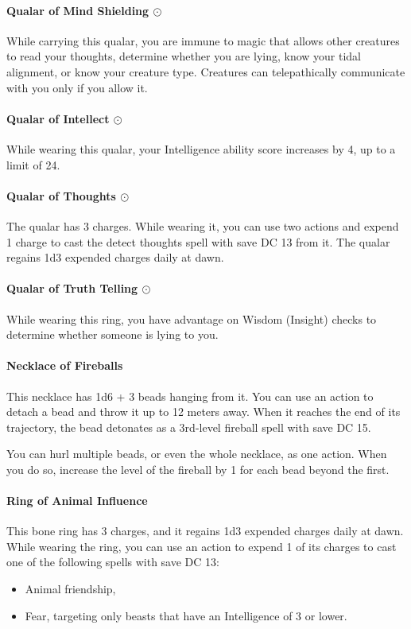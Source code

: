     \paragraph{Qualar of Mind Shielding $\odot$}
        While carrying this qualar, you are immune to magic that allows other creatures to read your thoughts, determine whether you are lying, know your tidal alignment, or know your creature type.
        Creatures can telepathically communicate with you only if you allow it.
    \paragraph{Qualar of Intellect $\odot$}
        While wearing this qualar, your Intelligence ability score increases by 4, up to a limit of 24.
    \paragraph{Qualar of Thoughts $\odot$}
        The qualar has 3 charges.
        While wearing it, you can use two actions and expend 1 charge to cast the detect thoughts spell with save DC 13 from it.
        The qualar regains 1d3 expended charges daily at dawn.
    \paragraph{Qualar of Truth Telling $\odot$}
        While wearing this ring, you have advantage on Wisdom (Insight) checks to determine whether someone is lying to you.
    \paragraph{Necklace of Fireballs}
        This necklace has 1d6 + 3 beads hanging from it. You can use an action to detach a bead and throw it up to 12 meters away.
        When it reaches the end of its trajectory, the bead detonates as a 3rd-level fireball spell with save DC 15.

        You can hurl multiple beads, or even the whole necklace, as one action.
        When you do so, increase the level of the fireball by 1 for each bead beyond the first.
    \paragraph{Ring of Animal Influence}
        This bone ring has 3 charges, and it regains 1d3 expended charges daily at dawn.
        While wearing the ring, you can use an action to expend 1 of its charges to cast one of the following spells with save DC 13:
        \begin{itemize}
            \item Animal friendship,
            \item Fear, targeting only beasts that have an Intelligence of 3 or lower.
        \end{itemize}
